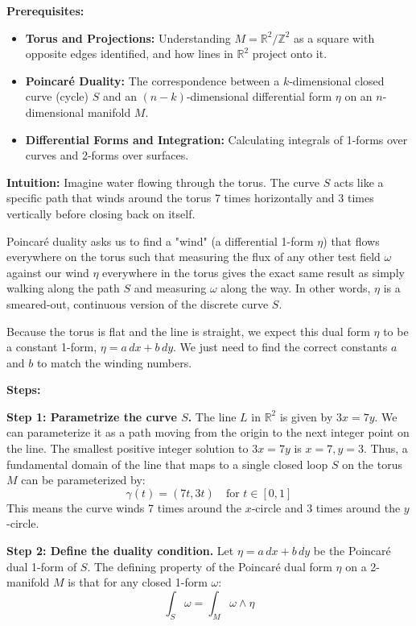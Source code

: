 \begin{solution}
\textbf{Prerequisites:} 
\begin{itemize}
    \item \textbf{Torus and Projections:} Understanding $M = \mathbb{R}^2 / \mathbb{Z}^2$ as a square with opposite edges identified, and how lines in $\mathbb{R}^2$ project onto it.
    \item \textbf{Poincaré Duality:} The correspondence between a $k$-dimensional closed curve (cycle) $S$ and an $(n-k)$-dimensional differential form $\eta$ on an $n$-dimensional manifold $M$.
    \item \textbf{Differential Forms and Integration:} Calculating integrals of 1-forms over curves and 2-forms over surfaces.
\end{itemize}

\textbf{Intuition:} 
Imagine water flowing through the torus. The curve $S$ acts like a specific path that winds around the torus 7 times horizontally and 3 times vertically before closing back on itself. 

Poincaré duality asks us to find a "wind" (a differential 1-form $\eta$) that flows everywhere on the torus such that measuring the flux of any other test field $\omega$ against our wind $\eta$ everywhere in the torus gives the exact same result as simply walking along the path $S$ and measuring $\omega$ along the way. In other words, $\eta$ is a smeared-out, continuous version of the discrete curve $S$.

Because the torus is flat and the line is straight, we expect this dual form $\eta$ to be a constant 1-form, $\eta = a\,dx + b\,dy$. We just need to find the correct constants $a$ and $b$ to match the winding numbers.

\textbf{Steps:}

\textbf{Step 1: Parametrize the curve $S$.}
The line $L$ in $\mathbb{R}^2$ is given by $3x = 7y$. We can parameterize it as a path moving from the origin to the next integer point on the line. 
The smallest positive integer solution to $3x = 7y$ is $x = 7, y = 3$.
Thus, a fundamental domain of the line that maps to a single closed loop $S$ on the torus $M$ can be parameterized by:
\[ \gamma(t) = (7t, 3t) \quad \text{for } t \in [0, 1] \]
This means the curve winds 7 times around the $x$-circle and 3 times around the $y$-circle.

\textbf{Step 2: Define the duality condition.}
Let $\eta = a\,dx + b\,dy$ be the Poincaré dual 1-form of $S$. 
The defining property of the Poincaré dual form $\eta$ on a 2-manifold $M$ is that for any closed 1-form $\omega$:
\[ \int_S \omega = \int_M \omega \wedge \eta \]


\end{solution}
